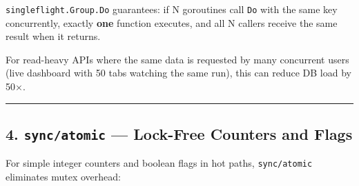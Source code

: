 \documentclass[
]{article}
\begin{document}
\texttt{singleflight.Group.Do} guarantees: if N goroutines call
\texttt{Do} with the same key concurrently, exactly \textbf{one}
function executes, and all N callers receive the same result when it
returns.

For read-heavy APIs where the same data is requested by many concurrent
users (live dashboard with 50 tabs watching the same run), this can
reduce DB load by 50×.

\begin{center}\rule{0.5\linewidth}{0.5pt}\end{center}

\hypertarget{syncatomic-lock-free-counters-and-flags}{%
\subsection{\texorpdfstring{4. \texttt{sync/atomic} --- Lock-Free
Counters and
Flags}{4. sync/atomic --- Lock-Free Counters and Flags}}\label{syncatomic-lock-free-counters-and-flags}}

For simple integer counters and boolean flags in hot paths,
\texttt{sync/atomic} eliminates mutex overhead:
\end{document}
